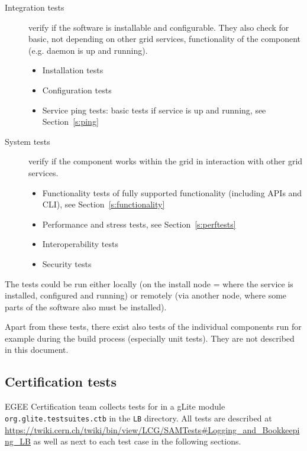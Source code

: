 \begin{description}
\item[Integration tests] verify if the software is installable and configurable.
They also check for basic, not depending on other grid services, functionality
of the component (e.g. daemon is up and running).
\begin{itemize}
\item Installation tests %
\item Configuration tests %
\item Service ping tests: basic tests if service is up and running, see Section~\ref{s:ping}
\end{itemize}
%
\item[System tests] verify if the component works within the grid in
interaction with other grid services.
\begin{itemize}
\item Functionality tests of fully supported functionality (including APIs and CLI), see Section~\ref{s:functionality}
\item Performance and stress tests, see Section~\ref{s:perftests}
\item Interoperability tests %
\item Security tests %
\end{itemize}
\end{description}

The tests could be run either locally (on the install node = where the service
is installed, configured and running) or remotely (via another node, where some
parts of the software also must be installed).

Apart from these tests, there exist also tests of the individual components run
for example during the build process (especially unit tests). They are not
described in this document.


\subsection{Certification tests}

EGEE Certification team collects tests for \LB in a gLite module
\verb'org.glite.testsuites.ctb' in the \verb'LB' directory. All \LB tests are
described at
\url{https://twiki.cern.ch/twiki/bin/view/LCG/SAMTests#Logging_and_Bookkeeping_LB}
as well as next to each test case in the following sections.

